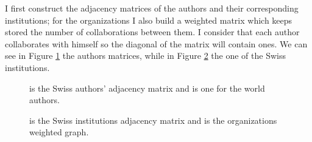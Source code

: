 \documentclass[]{usiinfbachelorproject}
\begin{document}
I first construct the adjacency matrices of the authors and their corresponding institutions; for the organizations I also build a weighted matrix which keeps stored the number of collaborations between them. I consider that each author collaborates with himself so the diagonal of the matrix will contain ones.
We can see in Figure \ref{fig:authorsAdj} the authors matrices, while in Figure \ref{fig:univAdj} the one of the Swiss institutions.

\begin{figure}[tb]
	\centering
	\caption{ is the Swiss authors' adjacency matrix and  is one for the world authors.}
	\label{fig:authorsAdj}
\end{figure}

\begin{figure}[tb]
	\centering
	\caption{  is the Swiss institutions adjacency matrix and  is the organizations weighted graph.}
	\label{fig:univAdj}
\end{figure}
\end{document}

